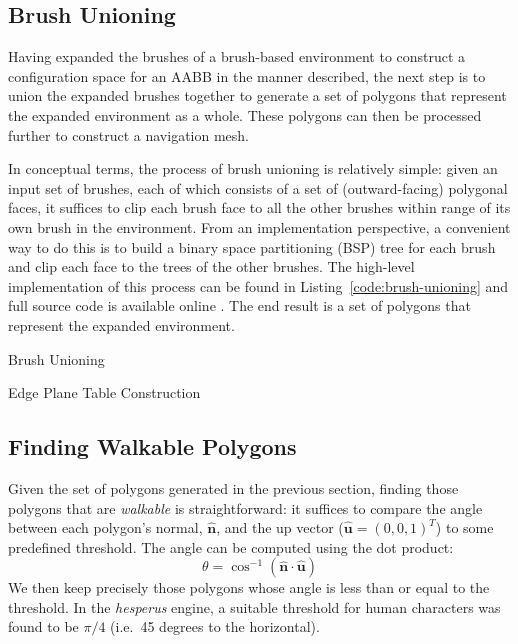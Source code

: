 \documentclass[10pt,twocolumn]{article}
\begin{document}
\subsection{Brush Unioning}

Having expanded the brushes of a brush-based environment to construct a configuration space for an AABB in the manner described, the next step is to union the expanded brushes together to generate a set of polygons that represent the expanded environment as a whole. These polygons can then be processed further to construct a navigation mesh.

In conceptual terms, the process of brush unioning is relatively simple: given an input set of brushes, each of which consists of a set of (outward-facing) polygonal faces, it suffices to clip each brush face to all the other brushes within range of its own brush in the environment. From an implementation perspective, a convenient way to do this is to build a binary space partitioning (BSP) tree for each brush and clip each face to the trees of the other brushes. The high-level implementation of this process can be found in Listing~\ref{code:brush-unioning} and full source code is available online \cite{hesperus}. The end result is a set of polygons that represent the expanded environment.

\begin{stulisting}[t]
\caption{Brush Unioning}
\label{code:brush-unioning}

\end{stulisting}

\begin{stulisting}[t]
\caption{Edge Plane Table Construction}
\label{code:ept-construction}

\end{stulisting}

\subsection{Finding Walkable Polygons}

Given the set of polygons generated in the previous section, finding those polygons that are \emph{walkable} is straightforward: it suffices to compare the angle between each polygon's normal, $\mathbf{\hat{n}}$, and the up vector ($\mathbf{\hat{u}} = (0,0,1)^T$) to some predefined threshold. The angle can be computed using the dot product:
%
\[
\theta = \cos^{-1} \left( \mathbf{\hat{n}} \cdot \mathbf{\hat{u}} \right)
\]
%
We then keep precisely those polygons whose angle is less than or equal to the threshold. In the \emph{hesperus} engine, a suitable threshold for human characters was found to be $\pi/4$ (i.e.~45 degrees to the horizontal).
\end{document}

